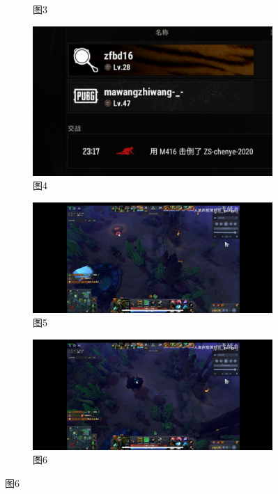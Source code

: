 \documentclass[12pt, a4paper, oneside]{ctexart}
\begin{document}
\begin{figure}[htbp]
\begin{subfigure}{0.3\textwidth}
        \caption{图3}
    \end{subfigure}

    \medskip %

    \begin{subfigure}{0.3\textwidth}
        \centering
        \includegraphics[width=\textwidth]{fig/4.png} %
        \caption{图4}
    \end{subfigure}
    \hfill
    \begin{subfigure}{0.3\textwidth}
        \centering
        \includegraphics[width=\textwidth]{fig/5.png} %
        \caption{图5}
    \end{subfigure}
    \hfill
    \begin{subfigure}{0.3\textwidth}
        \centering
        \includegraphics[width=\textwidth]{fig/6.png} %
        \caption{图6}
    \end{subfigure}


\end{figure}
\end{document}
